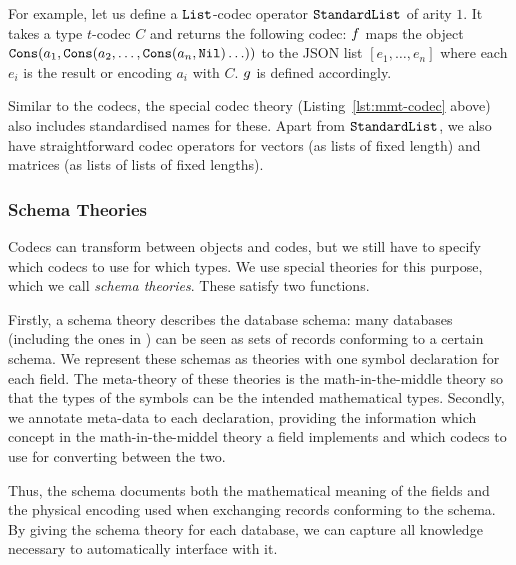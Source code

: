 For example, let us define a $\lst$-codec operator $\standardList$ of arity $1$.
It takes a type $t$-codec $C$ and returns the following codec: $\enc$ maps the object $\cons(a_1,\cons(a_2,\ldots,\cons(a_n,\nil)\ldots))$ to the JSON list $[e_1,\ldots,e_n]$ where each $e_i$ is the result or encoding $a_i$ with $C$.
$\dec$ is defined accordingly.

Similar to the codecs, the special \MMT codec theory (Listing~\ref{lst:mmt-codec} above) also includes standardised names for these.
Apart from $\standardList$, we also have straightforward codec operators for vectors (as lists of fixed length) and matrices (as lists of lists of fixed lengths).

\subsubsection{Schema Theories}


Codecs can transform between \MMT objects and codes, but we still have to specify which codecs to use for which types.
We use special theories for this purpose, which we call \emph{schema theories}.
These satisfy two functions.

Firstly, a schema theory describes the database schema: many databases (including the ones in \LMFDB) can be seen as sets of records conforming to a certain schema.
We represent these schemas as \MMT theories with one symbol declaration for each field.
The meta-theory of these theories is the math-in-the-middle theory so that the types of the symbols can be the intended mathematical types.
Secondly, we annotate meta-data to each declaration, providing the information which concept in the math-in-the-middel theory a field implements and which codecs to use for converting between the two.

Thus, the schema documents both the mathematical meaning of the fields and the physical encoding used when exchanging records conforming to the schema.
By giving the schema theory for each database, we can capture all knowledge necessary to automatically interface with it.

